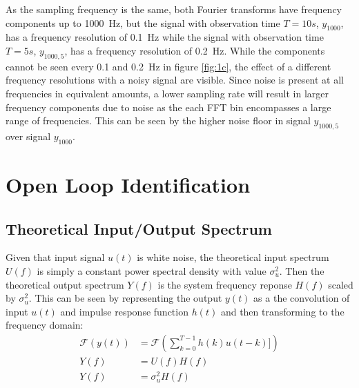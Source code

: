 \documentclass[11pt,a4paper]{article}
\begin{document}
As the sampling frequency is the same, both Fourier transforms have frequency
components up to \mbox{1000 Hz}, but the signal with observation time $T = 10
s$, $y_{1000}$, has a frequency resolution of \mbox{0.1 Hz} while the signal
with observation time $T = 5 s$, $y_{1000, 5}$, has a frequency resolution of
\mbox{0.2 Hz}. While the components cannot be seen every 0.1 and \mbox{0.2 Hz}
in figure \ref{fig:1c}, the effect of a different frequency resolutions with a
noisy signal are visible. Since noise is present at all frequencies in
equivalent amounts, a lower sampling rate will result in larger frequency
components due to noise as the each FFT bin encompasses a large range of
frequencies. This can be seen by the higher noise floor in signal $y_{1000, 5}$
over signal $y_{1000}$.

\section{Open Loop Identification}

\subsection{Theoretical Input/Output Spectrum}
Given that input signal $u(t)$ is white noise, the theoretical input spectrum
$U(f)$ is simply a constant power spectral density with value $\sigma_u^2$.
Then the theoretical output spectrum $Y(f)$ is the system frequency reponse
$H(f)$ scaled by $\sigma_u^2$. This can be seen by representing the output
$y(t)$ as a the convolution of input $u(t)$ and impulse response function
$h(t)$ and then transforming to the frequency domain:
\begin{align*}
    \mathcal{F}(y(t)) &= \mathcal{F}(\sum_{k=0}^{T-1} h(k)u(t - k)]) \\
    Y(f) &= U(f) H(f) \\
    Y(f) &= \sigma_u^2 H(f)
\end{align*}

\end{document}
